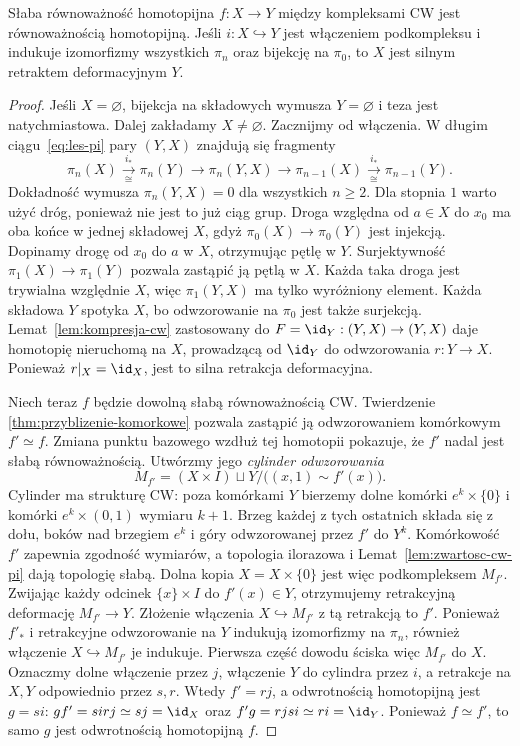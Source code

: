 \begin{twierdzenie}[Whitehead]
\label{thm:whitehead}
Słaba równoważność homotopijna
$f:X\to Y$ między kompleksami
CW jest równoważnością
homotopijną. Jeśli
$i:X\hookrightarrow Y$
jest włączeniem podkompleksu
i indukuje izomorfizmy
wszystkich $\pi_n$ oraz
bijekcję na $\pi_0$, to
$X$ jest silnym retraktem
deformacyjnym $Y$.
\end{twierdzenie}
\begin{proof}
Jeśli $X=\varnothing$, bijekcja na składowych wymusza $Y=\varnothing$
i teza jest natychmiastowa. Dalej zakładamy $X\ne\varnothing$.
Zacznijmy od włączenia.
W długim ciągu~\eqref{eq:les-pi}
pary $(Y,X)$ znajdują się
fragmenty
\[
 \pi_n(X)\xrightarrow[\cong]{i_*}
 \pi_n(Y)\longrightarrow
 \pi_n(Y,X)\longrightarrow
 \pi_{n-1}(X)
 \xrightarrow[\cong]{i_*}
 \pi_{n-1}(Y).
\]
Dokładność wymusza
$\pi_n(Y,X)=0$ dla
wszystkich $n\geq2$.
Dla stopnia $1$ warto użyć dróg, ponieważ nie jest to już ciąg grup.
Droga względna od $a\in X$ do $x_0$ ma oba końce w jednej składowej $X$,
gdyż $\pi_0(X)\to\pi_0(Y)$ jest injekcją. Dopinamy drogę
od $x_0$ do $a$ w $X$, otrzymując pętlę w $Y$.
Surjektywność $\pi_1(X)\to\pi_1(Y)$ pozwala zastąpić ją pętlą w $X$.
Każda taka droga jest trywialna względnie $X$, więc $\pi_1(Y,X)$
ma tylko wyróżniony element. Każda składowa $Y$ spotyka $X$,
bo odwzorowanie na $\pi_0$ jest także surjekcją.
Lemat~\ref{lem:kompresja-cw}
zastosowany do
$F=\id_Y:(Y,X)\to(Y,X)$
daje homotopię nieruchomą
na $X$, prowadzącą od
$\id_Y$ do odwzorowania
$r:Y\to X$.
Ponieważ $r|_X=\id_X$,
jest to silna retrakcja
deformacyjna.

Niech teraz $f$ będzie
dowolną słabą równoważnością
CW. Twierdzenie
\ref{thm:przyblizenie-komorkowe}
pozwala zastąpić ją
odwzorowaniem komórkowym $f'\simeq f$.
Zmiana punktu bazowego wzdłuż tej homotopii pokazuje,
że $f'$ nadal jest słabą równoważnością.
Utwórzmy jego
\emph{cylinder odwzorowania}
\[
 M_{f'}=(X\times I)\sqcup Y/
       \bigl((x,1)\sim f'(x)\bigr).
\]
Cylinder ma strukturę CW: poza komórkami $Y$ bierzemy dolne
komórki $e^k\times\{0\}$ i komórki $e^k\times(0,1)$ wymiaru $k+1$.
Brzeg każdej z tych ostatnich składa się z dołu, boków nad
brzegiem $e^k$ i góry odwzorowanej przez $f'$ do $Y^k$.
Komórkowość $f'$ zapewnia zgodność wymiarów, a topologia
ilorazowa i Lemat~\ref{lem:zwartosc-cw-pi} dają topologię słabą.
Dolna kopia $X=X\times\{0\}$ jest więc podkompleksem $M_{f'}$.
Zwijając każdy odcinek
$\{x\}\times I$ do
$f'(x)\in Y$, otrzymujemy
retrakcyjną deformację
$M_{f'}\to Y$.
Złożenie włączenia
$X\hookrightarrow M_{f'}$
z tą retrakcją to $f'$.
Ponieważ $f'_*$ i
retrakcyjne odwzorowanie na $Y$
indukują izomorfizmy
na $\pi_n$, również
włączenie $X\hookrightarrow
M_{f'}$ je indukuje.
Pierwsza część dowodu
ściska więc $M_{f'}$
do $X$. Oznaczmy dolne włączenie przez $j$, włączenie $Y$ do cylindra przez $i$,
a retrakcje na $X,Y$ odpowiednio przez $s,r$.
Wtedy $f'=rj$, a odwrotnością homotopijną jest $g=si$:
$gf'=sirj\simeq sj=\id_X$ oraz $f'g=rjsi\simeq ri=\id_Y$.
Ponieważ $f\simeq f'$, to samo $g$ jest odwrotnością homotopijną $f$.
\end{proof}

